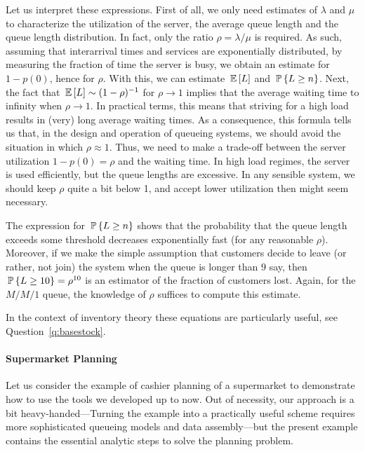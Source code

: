 Let us interpret these expressions. First of all, we only need
estimates of $\lambda$ and $\mu$ to characterize the utilization of
the server, the average queue length and the queue length
distribution. In fact, only the ratio $\rho=\lambda/\mu$ is required.
As such, assuming that interarrival times and services are
exponentially distributed, by measuring the fraction of time the
server is busy, we obtain an estimate for $1-p(0)$, hence for $\rho$.
With this, we can estimate $\E L$ and $\P{L\geq n}$.  Next, the fact
that $\E L \sim (1-\rho)^{-1}$ for $\rho\to 1$ implies that the
average waiting time  to
infinity when $\rho\to1$.  In practical terms, this means that
striving for a high load results in (very) long average waiting
times. As a consequence, this formula tells us that, in the design and
operation of queueing systems, we should avoid the situation in which
$\rho\approx 1$. Thus, we need to make a trade-off between the server
utilization $1-p(0) = \rho$ and the waiting time. In high load
regimes, the server is used efficiently, but the queue lengths are
excessive. In any sensible system, we should keep $\rho$ quite a bit
below 1, and accept lower utilization then might seem necessary.

The expression for $\P{L\geq n}$ shows that the probability that the
queue length exceeds some threshold decreases exponentially fast (for
any reasonable $\rho$). Moreover, if we make the simple assumption
that customers decide to leave (or rather, not join) the system when
the queue is longer than $9$ say, then $\P{L\geq 10} = \rho^{10}$ is
an estimator of the fraction of customers lost. Again, for the $M/M/1$
queue, the knowledge of $\rho$ suffices to compute this estimate.

In the context of inventory theory these equations are particularly useful, see Question~\ref{q:basestock}.

\paragraph{Supermarket Planning}

Let us consider the example of cashier planning of a supermarket to
demonstrate how to use the tools we developed up to now. Out of
necessity, our approach is a bit heavy-handed---Turning the example
into a practically useful scheme requires more sophisticated queueing
models and data assembly---but the present example contains the
essential analytic steps to solve the planning problem.


